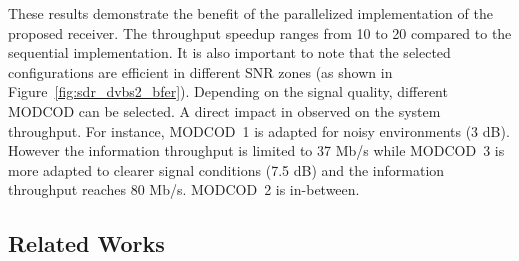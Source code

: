 These results demonstrate the benefit of the parallelized implementation of the
proposed receiver. The throughput speedup ranges from 10 to 20 compared to the
sequential implementation. It is also important to note that the selected
configurations are efficient in different SNR zones (as shown in
Figure~\ref{fig:sdr_dvbs2_bfer}). Depending on the signal quality, different
MODCOD can be selected. A direct impact in observed on the system throughput.
For instance, MODCOD~1 is adapted for noisy environments (3 dB). However the
information throughput is limited to 37 Mb/s while MODCOD~3 is more adapted to
clearer  signal conditions (7.5 dB) and the information throughput reaches
80 Mb/s. MODCOD~2 is in-between.

\subsection{Related Works}

